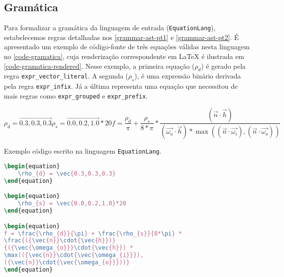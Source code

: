 \subsection{Gramática}

Para formalizar a gramática da linguagem de entrada (\texttt{EquationLang}), estabelecemos regras detalhadas nos \autoref{grammar-ast-pt1} e \autoref{grammar-ast-pt2}. É apresentado um exemplo de código-fonte de três equações válidas nesta linguagem no \autoref{code-gramatica}, cuja renderização correspondente em \LaTeX{} é ilustrada em \autoref{code-gramatica-rendered}. Nesse exemplo, a primeira equação ($\rho_{d}$) é gerado pela regra \verb"expr_vector_literal". A segunda ($\rho_{s}$), é uma expressão binário derivada pela regra \verb"expr_infix". Já a última representa uma equação que necessitou de mais regras como \verb"expr_grouped" e \verb"expr_prefix".

\label{code-gramatica-rendered} \begin{subequations}
\begin{equation}
    \rho_{d} = \vec{0.3,0.3,0.3}
\end{equation}
\begin{equation}
    \rho_{s} = \vec{0.0,0.2,1.0}*20
\end{equation}
\begin{equation}
f = \frac{\rho_{d}}{\pi} + \frac{\rho_{s}}{8*\pi} *
\frac{({\vec{n}}\cdot{\vec{h}})}
{({\vec{\omega_{o}}}\cdot{\vec{h}}) *
\max(({\vec{n}}\cdot{\vec{\omega_{i}}}),
({\vec{n}}\cdot{\vec{\omega_{o}}}))}
\end{equation}
\end{subequations}


\begin{codigo}[htb]
        \caption{\small Exemplo código escrito na linguagem \texttt{EquationLang}. }
        \label{code-gramatica}
\begin{lstlisting}[language=tex, frame=none]
\begin{equation}
    \rho_{d} = \vec{0.3,0.3,0.3}
\end{equation}

\begin{equation}
    \rho_{s} = \vec{0.0,0.2,1.0}*20
\end{equation}

\begin{equation}
f = \frac{\rho_{d}}{\pi} + \frac{\rho_{s}}{8*\pi} *
\frac{({\vec{n}}\cdot{\vec{h}})}
{({\vec{\omega_{o}}}\cdot{\vec{h}}) *
\max(({\vec{n}}\cdot{\vec{\omega_{i}}}),
({\vec{n}}\cdot{\vec{\omega_{o}}}))}
\end{equation}

\end{lstlisting}
\end{codigo}

